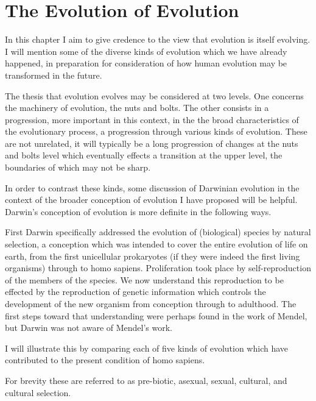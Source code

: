 \chapter{The Evolution of Evolution}\label{EvolutionOfEvolution}

In this chapter I aim to give credence to the view that evolution is itself evolving.
I will mention some of the diverse kinds of evolution which we have already happened, in preparation for consideration of how human evolution may be transformed in the future.

The thesis that evolution evolves may be considered at two levels.
One concerns the machinery of evolution, the nuts and bolts.
The other consists in a progression, more important in this context, in the the broad characteristics of the evolutionary process, a progression through various kinds of evolution.
These are not unrelated, it will typically be a long progression of changes at the nuts and bolts level which eventually effects a transition at the upper level, the boundaries of which may not be sharp.

In order to contrast these kinds, some discussion of Darwinian evolution in the context of the broader conception of evolution I have proposed will be helpful.
Darwin's conception of evolution is more definite in the following ways.

First Darwin specifically addressed the evolution of (biological) species by natural selection, a conception which was intended to cover the entire evolution of life on earth, from the first unicellular prokaryotes (if they were indeed the first living organisms) through to homo sapiens.
Proliferation took place by self-reproduction of the members of the species.
We now understand this reproduction to be effected by the reproduction of genetic information which controls the development of the new organism from conception through to adulthood.
The first steps toward that understanding were perhaps found in the work of Mendel, but Darwin was not aware of Mendel's work. 

I will illustrate this by comparing each of five kinds of evolution which have contributed to the present condition of homo sapiens.

For brevity these are referred to as pre-biotic, asexual, sexual, cultural, and cultural selection.


